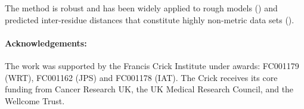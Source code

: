 \documentclass[preprint,12pt]{elsarticle}
\begin{document}
The method is robust and
has been widely applied to rough models (\cite{TaylorWRet09a}) and predicted inter-residue distances that
constitute highly non-metric data sets (\cite{AszodiAet94a}).
















\paragraph{Acknowledgements:}
The work was supported by the Francis Crick Institute under awards: FC001179 (WRT), FC001162 (JPS) and FC001178 (IAT).
The Crick receives its core funding from Cancer Research UK, the UK Medical Research Council, and the Wellcome Trust.
\end{document}
